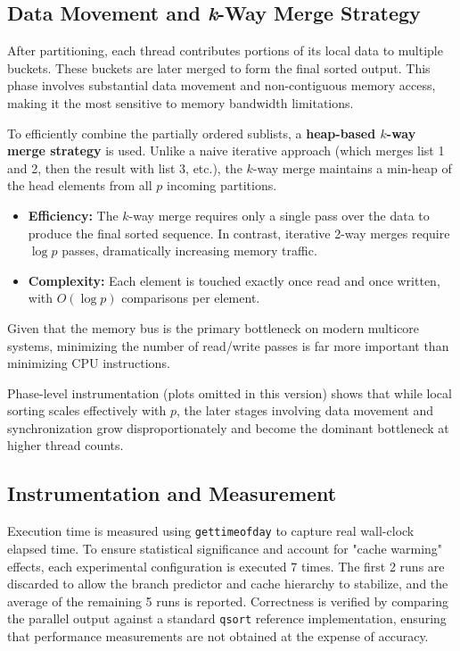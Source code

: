 \documentclass[11pt]{article}
\begin{document}
\subsection{Data Movement and \textit{k}-Way Merge Strategy}

After partitioning, each thread contributes portions of its local data to multiple buckets. These buckets are later merged to form the final sorted output. This phase involves substantial data movement and non-contiguous memory access, making it the most sensitive to memory bandwidth limitations.

To efficiently combine the partially ordered sublists, a \textbf{heap-based $k$-way merge strategy} is used.
Unlike a naive iterative approach (which merges list 1 and 2, then the result with list 3, etc.), the $k$-way merge maintains a min-heap of the head elements from all $p$ incoming partitions.
\begin{itemize}
    \item \textbf{Efficiency:} The $k$-way merge requires only a single pass over the data to produce the final sorted sequence. In contrast, iterative 2-way merges require $\log p$ passes, dramatically increasing memory traffic.
    \item \textbf{Complexity:} Each element is touched exactly once read and once written, with $O(\log p)$ comparisons per element.
\end{itemize}
Given that the memory bus is the primary bottleneck on modern multicore systems, minimizing the number of read/write passes is far more important than minimizing CPU instructions.

Phase-level instrumentation (plots omitted in this version) shows that while local sorting scales effectively with $p$, the later stages involving data movement and synchronization grow disproportionately and become the dominant bottleneck at higher thread counts.

\subsection{Instrumentation and Measurement}

Execution time is measured using \texttt{gettimeofday} to capture real wall-clock elapsed time. To ensure statistical significance and account for "cache warming" effects, each experimental configuration is executed 7 times. The first 2 runs are discarded to allow the branch predictor and cache hierarchy to stabilize, and the average of the remaining 5 runs is reported. Correctness is verified by comparing the parallel output against a standard \texttt{qsort} reference implementation, ensuring that performance measurements are not obtained at the expense of accuracy.
\end{document}
